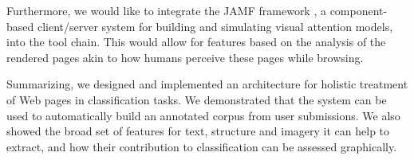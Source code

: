 Furthermore, we would like to integrate the JAMF framework \cite{steger08}, a component-based client/server system for building and simulating visual attention models, into the tool chain.
This would allow for features based on the analysis of the rendered pages akin to how humans perceive these pages while browsing.

Summarizing, we designed and implemented an architecture for holistic treatment of Web pages in classification tasks.
We demonstrated that the {\KrdWrd} system can be used to automatically build an annotated corpus from user submissions.
We also showed the broad set of features for text, structure and imagery it can help to extract, and how their contribution to classification can be assessed graphically.

\review{

}

